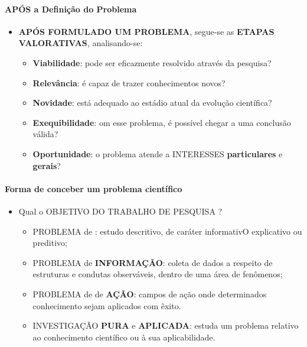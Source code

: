 \documentclass[
]{book}
\providecommand{\tightlist}{%
  \setlength{\itemsep}{0pt}\setlength{\parskip}{0pt}}
\begin{document}
\hypertarget{apuxf3s-a-definiuxe7uxe3o-do-problema}{%
\paragraph{APÓS a Definição do Problema}\label{apuxf3s-a-definiuxe7uxe3o-do-problema}}

\begin{itemize}
\tightlist
\item
  \textbf{APÓS FORMULADO UM PROBLEMA}, segue-se as \textbf{ETAPAS VALORATIVAS}, analisando-se:

  \begin{itemize}
  \tightlist
  \item
    \textbf{Viabilidade}: pode ser eficazmente resolvido através da pesquisa?
  \item
    \textbf{Relevância}: é capaz de trazer conhecimentos novos?
  \item
    \textbf{Novidade}: está adequado ao estádio atual da evolução científica?
  \item
    \textbf{Exequibilidade}: om esse problema, é possível chegar a uma conclusão
    válida?
  \item
    \textbf{Oportunidade}: o problema atende a INTERESSES \textbf{particulares} e \textbf{gerais}?
  \end{itemize}
\end{itemize}

\hypertarget{forma-de-conceber-um-problema-cientuxedfico}{%
\paragraph{Forma de conceber um problema científico}\label{forma-de-conceber-um-problema-cientuxedfico}}

\begin{itemize}
\tightlist
\item
  Qual o OBJETIVO DO TRABALHO DE PESQUISA ?

  \begin{itemize}
  \tightlist
  \item
    PROBLEMA de : estudo descritivo, de caráter informativO explicativo ou preditivo;
  \item
    PROBLEMA de \textbf{INFORMAÇÃO}: coleta de dados a respeito de estruturas e condutas observáveis, dentro de uma área de fenômenos;
  \item
    PROBLEMA de de \textbf{AÇÃO}: campos de ação onde determinados conhecimento
    sejam aplicados com êxito.
  \item
    INVESTIGAÇÃO \textbf{PURA} e \textbf{APLICADA}: estuda um problema relativo ao conhecimento científico ou à sua aplicabilidade.
  \end{itemize}
\end{itemize}
\end{document}
